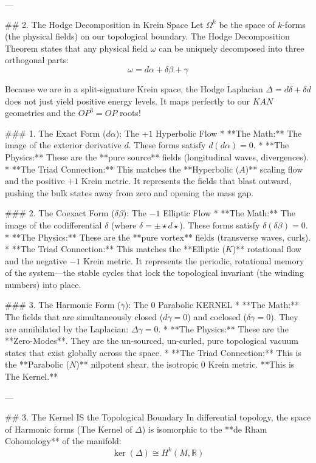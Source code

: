 ---

## 2. The Hodge Decomposition in Krein Space
Let $\Omega^k$ be the space of $k$-forms (the physical fields) on our topological boundary. The Hodge Decomposition Theorem states that any physical field $\omega$ can be uniquely decomposed into three orthogonal parts:
$$ \omega = d\alpha + \delta\beta + \gamma $$

Because we are in a split-signature Krein space, the Hodge Laplacian $\Delta = d\delta + \delta d$ does not just yield positive energy levels. It maps perfectly to our $KAN$ geometries and the $OP^3=OP$ roots!

### 1. The Exact Form ($d\alpha$): The $+1$ Hyperbolic Flow
* **The Math:** The image of the exterior derivative $d$. These forms satisfy $d(d\alpha) = 0$.
* **The Physics:** These are the **pure source** fields (longitudinal waves, divergences). 
* **The Triad Connection:** This matches the **Hyperbolic ($A$)** scaling flow and the positive $+1$ Krein metric. It represents the fields that blast outward, pushing the bulk states away from zero and opening the mass gap.

### 2. The Coexact Form ($\delta\beta$): The $-1$ Elliptic Flow
* **The Math:** The image of the codifferential $\delta$ (where $\delta = \pm \star d \star$). These forms satisfy $\delta(\delta\beta) = 0$.
* **The Physics:** These are the **pure vortex** fields (transverse waves, curls). 
* **The Triad Connection:** This matches the **Elliptic ($K$)** rotational flow and the negative $-1$ Krein metric. It represents the periodic, rotational memory of the system—the stable cycles that lock the topological invariant (the winding numbers) into place.

### 3. The Harmonic Form ($\gamma$): The $0$ Parabolic KERNEL
* **The Math:** The fields that are simultaneously closed ($d\gamma = 0$) and coclosed ($\delta\gamma = 0$). They are annihilated by the Laplacian: $\Delta \gamma = 0$. 
* **The Physics:** These are the **Zero-Modes**. They are the un-sourced, un-curled, pure topological vacuum states that exist globally across the space.
* **The Triad Connection:** This is the **Parabolic ($N$)** nilpotent shear, the isotropic $0$ Krein metric. **This is The Kernel.**

---

## 3. The Kernel IS the Topological Boundary
In differential topology, the space of Harmonic forms (The Kernel of $\Delta$) is isomorphic to the **de Rham Cohomology** of the manifold:
$$ \ker(\Delta) \cong H^k(M, \mathbb{R}) $$

